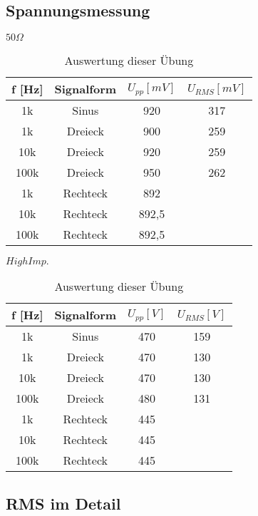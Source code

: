 \subsection{Spannungsmessung}


$50\Omega$
\begin{table}[h]
	\centering
	\begin{tabular}{|c|c|c|c|}
	\hline 
	f [Hz]		& Signalform		& $U_{pp} [mV]$	& $U_{RMS} [mV]$		\\ 
	\hline 
	1k		& Sinus		& 920			& 317			\\ 
	\hline 
	1k		& Dreieck		& 900			& 259			\\ 
	\hline 
	10k		& Dreieck		& 920			& 259			\\ 
	\hline 
	100k		& Dreieck		& 950			& 262			\\ 
	\hline 
	1k		& Rechteck		& 892			& 		\\ 
	\hline 
	10k		& Rechteck		& 892,5		& 		\\ 
	\hline 
	100k		& Rechteck		& 892,5		& 		\\ 
	\hline 
	\end{tabular}
	\caption{Auswertung dieser Übung}
\end{table}

$High Imp.$
\begin{table}[h]
	\centering
	\begin{tabular}{|c|c|c|c|}
	\hline 
	f [Hz]		& Signalform		& $U_{pp} [V]$	& $U_{RMS} [V]$		\\ 
	\hline 
	1k		& Sinus		& 470			& 159			\\ 
	\hline 
	1k		& Dreieck		& 470			& 130			\\ 
	\hline 
	10k		& Dreieck		& 470			& 130			\\ 
	\hline 
	100k		& Dreieck		& 480			& 131			\\ 
	\hline 
	1k		& Rechteck		& 445			& 		\\ 
	\hline 
	10k		& Rechteck		& 445			& 		\\ 
	\hline 
	100k		& Rechteck		& 445			& 		\\ 
	\hline 
	\end{tabular}
	\caption{Auswertung dieser Übung}
\end{table}


\subsection{RMS im Detail}

